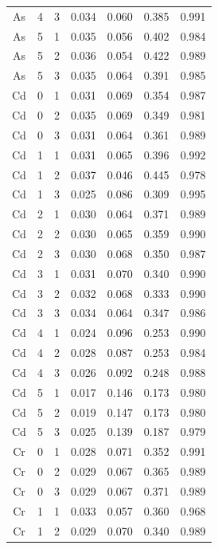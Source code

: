 \documentclass[ms, hidelinks]{uncgdissertationexp3}
\theoremstyle{plain}
\theoremstyle{definition}
\theoremstyle{remark}
\begin{document}
\begin{longtable}{ccccccc}
  \rowcolor{gray!6}  As & 4 & 3 & 0.034 & 0.060 & 0.385 & 0.991\\
  As & 5 & 1 & 0.035 & 0.056 & 0.402 & 0.984\\
  \rowcolor{gray!6}  As & 5 & 2 & 0.036 & 0.054 & 0.422 & 0.989\\
  As & 5 & 3 & 0.035 & 0.064 & 0.391 & 0.985\\
  \rowcolor{gray!6}  Cd & 0 & 1 & 0.031 & 0.069 & 0.354 & 0.987\\
  Cd & 0 & 2 & 0.035 & 0.069 & 0.349 & 0.981\\
  \rowcolor{gray!6}  Cd & 0 & 3 & 0.031 & 0.064 & 0.361 & 0.989\\
  Cd & 1 & 1 & 0.031 & 0.065 & 0.396 & 0.992\\
  \rowcolor{gray!6}  Cd & 1 & 2 & 0.037 & 0.046 & 0.445 & 0.978\\
  Cd & 1 & 3 & 0.025 & 0.086 & 0.309 & 0.995\\
  \rowcolor{gray!6}  Cd & 2 & 1 & 0.030 & 0.064 & 0.371 & 0.989\\
  Cd & 2 & 2 & 0.030 & 0.065 & 0.359 & 0.990\\
  \rowcolor{gray!6}  Cd & 2 & 3 & 0.030 & 0.068 & 0.350 & 0.987\\
  Cd & 3 & 1 & 0.031 & 0.070 & 0.340 & 0.990\\
  \rowcolor{gray!6}  Cd & 3 & 2 & 0.032 & 0.068 & 0.333 & 0.990\\
  Cd & 3 & 3 & 0.034 & 0.064 & 0.347 & 0.986\\
  \rowcolor{gray!6}  Cd & 4 & 1 & 0.024 & 0.096 & 0.253 & 0.990\\
  Cd & 4 & 2 & 0.028 & 0.087 & 0.253 & 0.984\\
  \rowcolor{gray!6}  Cd & 4 & 3 & 0.026 & 0.092 & 0.248 & 0.988\\
  Cd & 5 & 1 & 0.017 & 0.146 & 0.173 & 0.980\\
  \rowcolor{gray!6}  Cd & 5 & 2 & 0.019 & 0.147 & 0.173 & 0.980\\
  Cd & 5 & 3 & 0.025 & 0.139 & 0.187 & 0.979\\
  \rowcolor{gray!6}  Cr & 0 & 1 & 0.028 & 0.071 & 0.352 & 0.991\\
  Cr & 0 & 2 & 0.029 & 0.067 & 0.365 & 0.989\\
  \rowcolor{gray!6}  Cr & 0 & 3 & 0.029 & 0.067 & 0.371 & 0.989\\
  Cr & 1 & 1 & 0.033 & 0.057 & 0.360 & 0.968\\
  \rowcolor{gray!6}  Cr & 1 & 2 & 0.029 & 0.070 & 0.340 & 0.989\\

\end{longtable}
\end{document}
